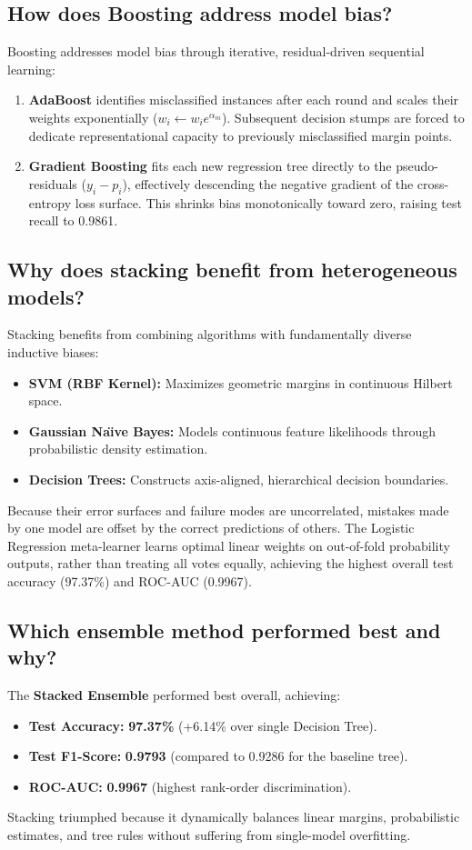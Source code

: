 \documentclass[12pt,a4paper]{article}
\begin{document}
\subsection{How does Boosting address model bias?}
Boosting addresses model bias through iterative, residual-driven sequential learning:
\begin{enumerate}
\item \textbf{AdaBoost} identifies misclassified instances after each round and scales their weights exponentially ($w_i \leftarrow w_i e^{\alpha_m}$). Subsequent decision stumps are forced to dedicate representational capacity to previously misclassified margin points.
\item \textbf{Gradient Boosting} fits each new regression tree directly to the pseudo-residuals ($y_i - p_i$), effectively descending the negative gradient of the cross-entropy loss surface. This shrinks bias monotonically toward zero, raising test recall to 0.9861.
\end{enumerate}

\subsection{Why does stacking benefit from heterogeneous models?}
Stacking benefits from combining algorithms with fundamentally diverse inductive biases:
\begin{itemize}
\item \textbf{SVM (RBF Kernel):} Maximizes geometric margins in continuous Hilbert space.
\item \textbf{Gaussian Na\"\i ve Bayes:} Models continuous feature likelihoods through probabilistic density estimation.
\item \textbf{Decision Trees:} Constructs axis-aligned, hierarchical decision boundaries.
\end{itemize}
Because their error surfaces and failure modes are uncorrelated, mistakes made by one model are offset by the correct predictions of others. The Logistic Regression meta-learner learns optimal linear weights on out-of-fold probability outputs, rather than treating all votes equally, achieving the highest overall test accuracy (97.37\%) and ROC-AUC (0.9967).

\subsection{Which ensemble method performed best and why?}
The \textbf{Stacked Ensemble} performed best overall, achieving:
\begin{itemize}
\item \textbf{Test Accuracy:} \textbf{97.37\%} (+6.14\% over single Decision Tree).
\item \textbf{Test F1-Score:} \textbf{0.9793} (compared to 0.9286 for the baseline tree).
\item \textbf{ROC-AUC:} \textbf{0.9967} (highest rank-order discrimination).
\end{itemize}
Stacking triumphed because it dynamically balances linear margins, probabilistic estimates, and tree rules without suffering from single-model overfitting.
\end{document}
